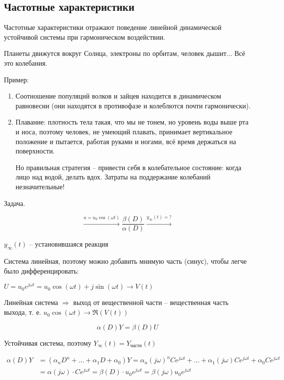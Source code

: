 \documentclass[main.tex]{subfiles}
\begin{document}
\subsection{Частотные характеристики}

Частотные характеристики отражают поведение линейной динамической устойчивой системы при гармоническом воздействии.

Планеты движутся вокруг Солнца, электроны по орбитам, человек дышит...
Всё это колебания.

Пример:
\begin{enumerate}[noitemsep]
	\item Соотношение популяций волков и зайцев находится в динамическом равновесии (они находятся в противофазе и колеблются почти гармонически).
	\item Плавание: плотность тела такая, что мы не тонем, но уровень воды выше рта и носа, поэтому человек, не умеющий плавать, принимает вертикальное положение и пытается, работая руками и ногами, всё время держаться на поверхности.

	Но правильная стратегия -- привести себя в колебательное состояние: когда лицо над водой, делать вдох.
	Затраты на поддержание колебаний незначительные!
\end{enumerate}

Задача.

$$ \xrightarrow{u = u_0 \cos (\omega t)} \boxed{\frac{\beta (D)}{\alpha (D)}} \xrightarrow{y_\infty(t) = ?} $$

$y_\infty(t)$ -- установившаяся реакция

Система линейная, поэтому можно добавить мнимую часть (синус), чтобы легче было дифференцировать:

$ U = u_0 e^{j \omega t} = u_0 \cos (\omega t) + j \sin (\omega t) \to V(t) $

Линейная система $ \Rightarrow $ выход от вещественной части -- вещественная часть выхода, т. е. $ u_0 \cos (\omega t) \to \Re(V(t)) $

$$ \alpha(D) Y = \beta(D) U $$

Устойчивая система, поэтому $ Y_\infty(t) = Y_{\text{частн}}(t) $

\begin{align*}
    \alpha(D)Y & = (\alpha_n D^n + ... + \alpha_1 D + \alpha_0) Y = \alpha_n (j \omega)^n Ce^{j \omega t} + ... + \alpha_1 (j\omega) C e^{j \omega t} + \alpha_0 Ce^{j \omega t} \\
    & = \alpha(j \omega) \cdot C e^{j \omega t} = \beta(D) \cdot u_0 e^{j\omega t} = \beta(j\omega) u_0 e^{j\omega t}
\end{align*}
\end{document}
